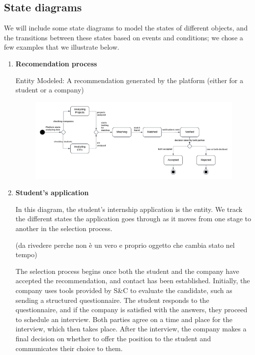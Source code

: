 \subsection{State diagrams}
We will include some state diagrams to model the states of different objects, and the transitions between these states based on events and conditions; we chose a few examples that we illustrate below.
\begin{enumerate}

\item \textbf{Recomendation process}

Entity Modeled: A recommendation generated by the platform (either for a student or a company)


\begin{figure}[H]
    \centering
    \includegraphics[width=1\linewidth]{RASD//Images/recomendation.png}
    \caption{}
    \label{fig:enter-label}
\end{figure}

\item \textbf{Student's application}

In this diagram, the student's internship application is the entity. We track the different states the application goes through as it moves from one stage to another in the selection process.

(da rivedere perche non è un vero e proprio oggetto che cambia stato nel tempo)

The selection process begins once both the student and the company have accepted the recommendation, and contact has been established. Initially, the company uses tools provided by S\&C to evaluate the candidate, such as sending a structured questionnaire. The student responds to the questionnaire, and if the company is satisfied with the answers, they proceed to schedule an interview. Both parties agree on a time and place for the interview, which then takes place. After the interview, the company makes a final decision on whether to offer the position to the student and communicates their choice to them.


\end{enumerate}

